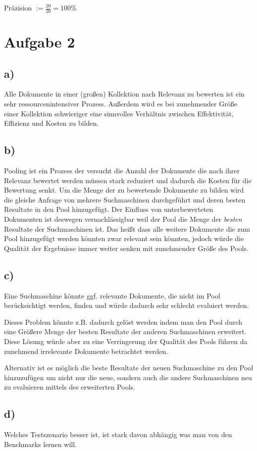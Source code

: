 \documentclass[11pt,a4paper,parskip=half ]{scrartcl}
\begin{document}
	Präzision $:= \frac{20}{20} = 100\%$ 
	
	\section*{Aufgabe 2}
	
	\subsection*{a)} Alle Dokumente in einer (großen) Kollektion nach Relevanz zu bewerten ist ein sehr ressourcenintensiver Prozess. Außerdem wird es bei zunehmender Größe einer Kollektion schwieriger eine sinnvolles Verhältnis zwischen Effektivität, Effizienz und Kosten zu bilden.
	\subsection*{b)} Pooling ist ein Prozess der versucht die Anzahl der Dokumente die nach ihrer Relevanz bewertet werden müssen stark reduziert und dadurch die Kosten für die Bewertung senkt. Um die Menge der zu bewertende Dokumente zu bilden wird die gleiche Anfrage von mehrere Suchmaschinen durchgeführt und deren besten Resultate in den Pool hinzugefügt. Der Einfluss von unterbewerteten Dokumenten ist deswegen vernachlässigbar weil der Pool die Menge der \textit{besten} Resultate der Suchmaschinen ist. Das heißt dass alle weitere Dokumente die zum Pool hinzugefügt werden könnten zwar relevant sein könnten, jedoch würde die Qualität der Ergebnisse immer weiter senken mit zunehmender Größe des Pools.
	\subsection*{c)} Eine Suchmaschine könnte ggf. relevante Dokumente, die nicht im Pool berücksichtigt werden, finden und würde dadurch sehr schlecht evaluiert werden. 
	
	Dieses Problem könnte z.B. dadurch gelöst werden indem man den Pool durch eine Größere Menge der besten Resultate der anderen Suchmaschinen erweitert. Diese Lösung würde aber zu eine Verringerung der Qualität des Pools führen da zunehmend irrelevante Dokumente betrachtet werden.
	
	Alternativ ist es möglich die beste Resultate der neuen Suchmaschine zu den Pool hinzuzufügen um nicht nur die neue, sondern auch die andere Suchmaschinen neu zu evaluieren mittels des erweiterten Pools.
	
	\subsection*{d)} Welches Testszenario besser ist, ist stark davon abhängig was man von den Benchmarks lernen will. 
	
\end{document}
